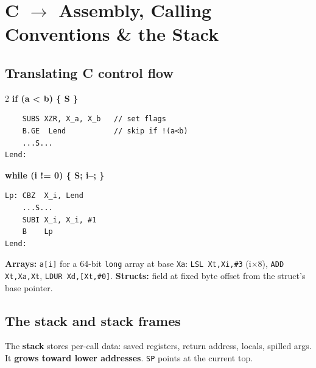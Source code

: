 \documentclass[10pt]{article}
\newcommand{\code}[1]{\texttt{\small #1}}
\begin{document}
\section{C $\to$ Assembly, Calling Conventions \& the Stack}

\subsection{Translating C control flow}
\begin{multicols}{2}
\textbf{if (a < b) \{ S \}}
\begin{lstlisting}
    SUBS XZR, X_a, X_b   // set flags
    B.GE  Lend           // skip if !(a<b)
    ...S...
Lend:
\end{lstlisting}
\columnbreak

\textbf{while (i != 0) \{ S; i--; \}}
\begin{lstlisting}
Lp: CBZ  X_i, Lend
    ...S...
    SUBI X_i, X_i, #1
    B    Lp
Lend:
\end{lstlisting}
\end{multicols}
\textbf{Arrays:} \code{a[i]} for a 64-bit \code{long} array at base \code{Xa}:
\code{LSL Xt,Xi,\#3} (i$\times$8), \code{ADD Xt,Xa,Xt}, \code{LDUR Xd,[Xt,\#0]}.
\textbf{Structs:} field at fixed byte offset from the struct's base pointer.

\subsection{The stack and stack frames}
The \textbf{stack} stores per-call data: saved registers, return address, locals, spilled args.
It \textbf{grows toward lower addresses}. \code{SP} points at the current top.

\begin{center}
\end{center}
\end{document}
